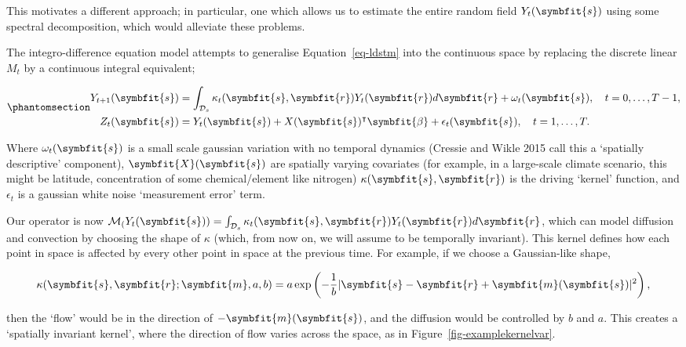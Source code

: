\documentclass[
]{report}
\newcommand{\bv}[1]{\symbfit{#1}}
\theoremstyle{plain}
\theoremstyle{plain}
\theoremstyle{plain}
\theoremstyle{remark}
\begin{document}
This motivates a different approach; in particular, one which allows us
to estimate the entire random field \(Y_t(\bv s)\) using some spectral
decomposition, which would alleviate these problems.

The integro-difference equation model attempts to generalise
Equation~\ref{eq-ldstm} into the continuous space by replacing the
discrete linear \(M_t\) by a continuous integral equivalent;

\begin{equation}\phantomsection\label{eq-IDEM}{\begin{split}
  Y_{t+1}(\bv s) &= \int_{\mathcal D_s} \kappa_t(\bv s,\bv r) Y_t(\bv r) d\bv r + \omega_t(\bv s), \quad t=0, \dots, T-1, \\
  Z_t(\bv s) &= Y_t(\bv s) + X(\bv s)^{\intercal}\bv \beta + \epsilon_t(\bv s), \quad t=1,\dots,T.
\end{split}
}\end{equation}

Where \(\omega_t(\bv s)\) is a small scale gaussian variation with no
temporal dynamics (Cressie and Wikle 2015 call this a `spatially
descriptive' component), \(\bv X(\bv s)\) are spatially varying
covariates (for example, in a large-scale climate scenario, this might
be latitude, concentration of some chemical/element like nitrogen)
\(\kappa(\bv s, \bv r)\) is the driving `kernel' function, and
\(\epsilon_t\) is a gaussian white noise `measurement error' term.

Our operator is now
\(\mathcal M_(Y_t(\bv s)) = \int_{\mathcal D_s} \kappa_t(\bv s,\bv r) Y_t(\bv r) d\bv r\),
which can model diffusion and convection by choosing the shape of
\(\kappa\) (which, from now on, we will assume to be temporally
invariant). This kernel defines how each point in space is affected by
every other point in space at the previous time. For example, if we
choose a Gaussian-like shape,

\[\begin{split}
  \kappa(\bv s, \bv r; \bv m, a, b) = a \exp \left( -\frac{1}{b} \vert \bv s- \bv r +\bv m(\bv s)\vert^2 \right),
\end{split}
\]

then the `flow' would be in the direction of \(-\bv m(\bv s)\), and the
diffusion would be controlled by \(b\) and \(a\). This creates a
`spatially invariant kernel', where the direction of flow varies across
the space, as in Figure~\ref{fig-examplekernelvar}.
\end{document}
